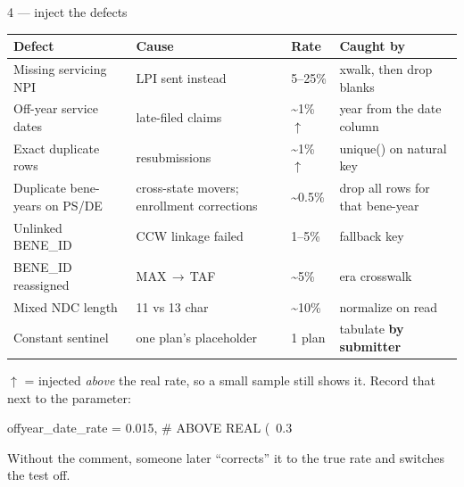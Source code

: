 \documentclass[notes,11pt, aspectratio=169, xcolor={table}]{beamer}
\newcommand{\code}[1]{{\ttfamily\small #1}}
\begin{document}
\begin{frame}[fragile]{4 --- inject the defects}

\vspace{-0.3em}
\footnotesize
\begin{center}
\begin{tabular}{L{0.235\textwidth} L{0.245\textwidth} L{0.09\textwidth} L{0.30\textwidth}}
\toprule
\textbf{Defect} & \textbf{Cause} & \textbf{Rate} & \textbf{Caught by} \\
\midrule
Missing servicing NPI & LPI sent instead & 5--25\% & xwalk, then drop blanks \\[3pt]
Off-year service dates & late-filed claims & \textasciitilde1\%\,$\uparrow$ & year from the date column \\[3pt]
Exact duplicate rows & resubmissions & \textasciitilde1\%\,$\uparrow$ & \code{unique()} on natural key \\[3pt]
Duplicate bene-years on PS/DE & cross-state movers; enrollment corrections & \textasciitilde0.5\% & drop all rows for that bene-year \\[3pt]
Unlinked BENE\_ID & CCW linkage failed & 1--5\% & fallback key \\[3pt]
BENE\_ID reassigned & MAX\,$\rightarrow$\,TAF & \textasciitilde5\% & era crosswalk \\[3pt]
Mixed NDC length & 11 vs 13 char & \textasciitilde10\% & normalize on read \\[3pt]
Constant sentinel & one plan's placeholder & 1 plan & tabulate \textbf{by submitter} \\
\bottomrule
\end{tabular}
\end{center}

\vspace{0.5em}
\normalsize
$\uparrow$ = injected \emph{above} the real rate, so a small sample still shows it. Record that
next to the parameter:

\vspace{0.2em}
\begin{semiverbatim}\small
  offyear_date_rate = 0.015,  \color{blue}# ABOVE REAL (~0.3%
\end{semiverbatim}

\vspace{0.1em}
{\small Without the comment, someone later ``corrects'' it to the true rate and switches the
test off.}
\end{frame}
\end{document}
